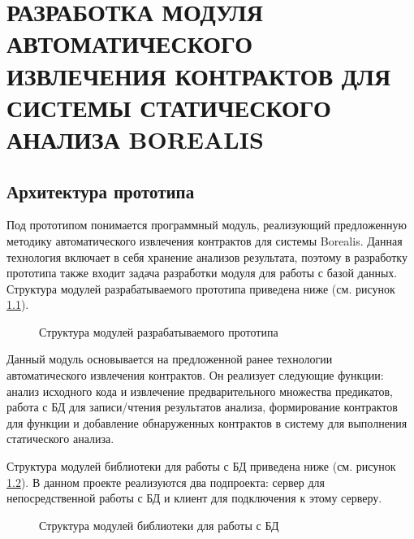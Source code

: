 \chapter{РАЗРАБОТКА МОДУЛЯ АВТОМАТИЧЕСКОГО ИЗВЛЕЧЕНИЯ КОНТРАКТОВ ДЛЯ СИСТЕМЫ СТАТИЧЕСКОГО АНАЛИЗА BOREALIS}
\label{chapter:developing}

\section{Архитектура прототипа}
Под прототипом понимается программный модуль, реализующий предложенную методику автоматического извлечения контрактов для системы Borealis. Данная технология включает в себя хранение анализов результата, поэтому в разработку прототипа  также входит задача разработки модуля для работы с базой данных. Структура модулей разрабатываемого прототипа приведена ниже (см. рисунок \ref{image:borealisStructure}).
\begin{figure}[h!]
\caption{Структура модулей разрабатываемого прототипа}
\label{image:borealisStructure}
\end{figure}

Данный модуль основывается на предложенной ранее технологии автоматического извлечения контрактов. Он реализует следующие функции: анализ исходного кода и извлечение предварительного множества предикатов, работа с БД для записи/чтения результатов анализа, формирование контрактов для функции и добавление обнаруженных контрактов в систему для выполнения статического анализа.

Структура модулей библиотеки для работы с БД приведена ниже (см. рисунок \ref{image:leveldbStructure}). В данном проекте реализуются два подпроекта: сервер для непосредственной работы с БД и клиент для подключения к этому серверу.
\begin{figure}[h!]
\caption{Структура модулей библиотеки для работы с БД}
\label{image:leveldbStructure}
\end{figure}


